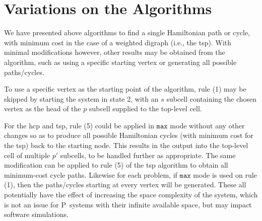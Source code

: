 \section{\label{sect:variations}Variations on the Algorithms}
We have presented above algorithms to find a single Hamiltonian path or cycle, with minimum cost in the case of a weighted digraph (i.e., the \gls{tsp}).  With minimal modifications however, other results may be obtained from the algorithm, such as using a specific starting vertex or generating all possible paths/cycles.

To use a specific vertex as the starting point of the algorithm, rule (1) may be skipped by starting the system in state 2, with an \(s\) subcell containing the chosen vertex as the head of the \(p\) subcell supplied to the top-level cell.

For the \gls{hcp} and \gls{tsp}, rule (5) could be applied in \(\mathtt{max}\) mode without any other changes so as to produce all possible Hamiltonian cycles (with minimum cost for the \gls{tsp}) back to the starting node.  This results in the output into the top-level cell of multiple \(p'\) subcells, to be handled further as appropriate.  The same modification can be applied to rule (5) of the \gls{tsp} algorithm to obtain all minimum-cost cycle paths.  Likewise for each problem, if \(\mathtt{max}\) mode is used on rule (1), then the paths/cycles starting at every vertex will be generated.  These all potentially have the effect of increasing the space complexity of the system, which is not an issue for P~systems with their infinite available space, but may impact software simulations.



